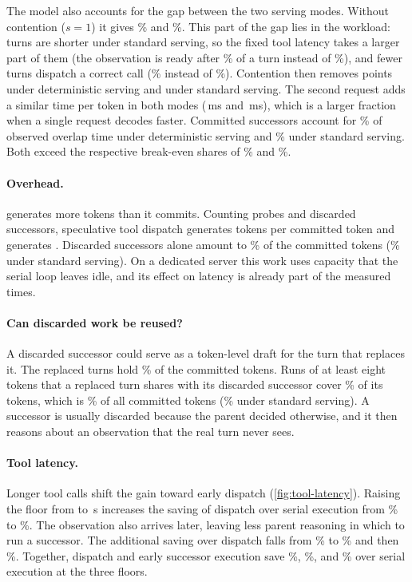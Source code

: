 The model also accounts for the gap between the two serving modes.
Without contention ($s=1$) it gives \CostDetIdeal\% and \CostStdIdeal\%.
This part of the gap lies in the workload: turns are shorter under standard serving, so the fixed tool latency takes a larger part of them (the observation is ready after \MotStdReadyPosPct\% of a turn instead of \MotReadyPosPct\%), and fewer turns dispatch a correct call (\MotStdAnchorPct\% instead of \MotAnchorPct\%).
Contention then removes \CostDetContention{} points under deterministic serving and \CostStdContention{} under standard serving.
The second request adds a similar time per token in both modes (\ConDetExtraMs\,ms and \ConStdExtraMs\,ms), which is a larger fraction when a single request decodes faster.
Committed successors account for \WinDetOverlapCommitPct\% of observed overlap time under deterministic serving and \WinStdOverlapCommitPct\% under standard serving. Both exceed the respective break-even shares of \CostDetBreakeven\% and \CostStdBreakeven\%.

\paragraph{Overhead.}
\method generates more tokens than it commits.
Counting probes and discarded successors, speculative tool dispatch generates \OvhDetGenDisp{} tokens per committed token and \method generates \OvhDetGenOurs.
Discarded successors alone amount to \OvhDetLostPctOurs\% of the committed tokens (\OvhStdLostPctOurs\% under standard serving).
On a dedicated server this work uses capacity that the serial loop leaves idle, and its effect on latency is already part of the measured times.

\paragraph{Can discarded work be reused?}
A discarded successor could serve as a token-level draft for the turn that replaces it.
The replaced turns hold \ReuseDetReplacedPct\% of the committed tokens.
Runs of at least eight tokens that a replaced turn shares with its discarded successor cover \ReuseDetSharedPct\% of its tokens, which is \ReuseDetSharedAllPct\% of all committed tokens (\ReuseStdSharedAllPct\% under standard serving).
A successor is usually discarded because the parent decided otherwise, and it then reasons about an observation that the real turn never sees.

\paragraph{Tool latency.}
Longer tool calls shift the gain toward early dispatch (\cref{fig:tool-latency}). Raising the floor from \ToolLowFloor{} to \ToolHighFloor\,s increases the saving of dispatch over serial execution from \ToolLowDispatch\% to \ToolHighDispatch\%.
The observation also arrives later, leaving less parent reasoning in which to run a successor. The additional saving over dispatch falls from \ToolLowIncrement\% to \ToolMidIncrement\% and then \ToolHighIncrement\%.
Together, dispatch and early successor execution save \ToolLowTotal\%, \ToolMidTotal\%, and \ToolHighTotal\% over serial execution at the three floors.

